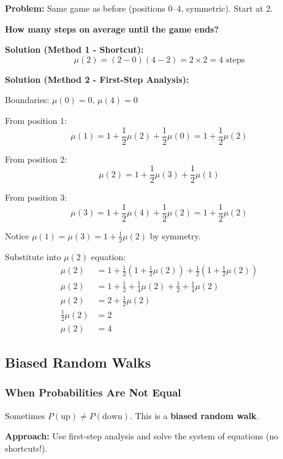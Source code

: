 \documentclass[10pt,letterpaper]{article}
\begin{document}
\begin{examplebox}
\textbf{Problem:} Same game as before (positions 0--4, symmetric). Start at 2.

\textbf{How many steps on average until the game ends?}

\textbf{Solution (Method 1 - Shortcut):}
\[
\mu(2) = (2 - 0)(4 - 2) = 2 \times 2 = \boxed{4 \text{ steps}}
\]

\textbf{Solution (Method 2 - First-Step Analysis):}

Boundaries: $\mu(0) = 0$, $\mu(4) = 0$

From position 1:
\[
\mu(1) = 1 + \frac{1}{2}\mu(2) + \frac{1}{2}\mu(0) = 1 + \frac{1}{2}\mu(2)
\]

From position 2:
\[
\mu(2) = 1 + \frac{1}{2}\mu(3) + \frac{1}{2}\mu(1)
\]

From position 3:
\[
\mu(3) = 1 + \frac{1}{2}\mu(4) + \frac{1}{2}\mu(2) = 1 + \frac{1}{2}\mu(2)
\]

Notice $\mu(1) = \mu(3) = 1 + \frac{1}{2}\mu(2)$ by symmetry.

Substitute into $\mu(2)$ equation:
\begin{align*}
\mu(2) &= 1 + \frac{1}{2}(1 + \frac{1}{2}\mu(2)) + \frac{1}{2}(1 + \frac{1}{2}\mu(2)) \\
\mu(2) &= 1 + \frac{1}{2} + \frac{1}{4}\mu(2) + \frac{1}{2} + \frac{1}{4}\mu(2) \\
\mu(2) &= 2 + \frac{1}{2}\mu(2) \\
\frac{1}{2}\mu(2) &= 2 \\
\mu(2) &= \boxed{4}
\end{align*}
\end{examplebox}

\subsection{Biased Random Walks}

\subsubsection{When Probabilities Are Not Equal}

Sometimes $P(\text{up}) \neq P(\text{down})$. This is a \textbf{biased random walk}.

\textbf{Approach:} Use first-step analysis and solve the system of equations (no shortcuts!).
\end{document}
